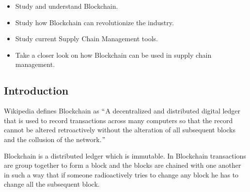 \documentclass[12pt]{article}
\begin{document}
\vspace{\baselineskip}
\begin{itemize}
	\item {\fontsize{14pt}{16.8pt}\selectfont Study and understand Blockchain.\par}\par

	\item {\fontsize{14pt}{16.8pt}\selectfont Study how Blockchain can revolutionize the industry.\par}\par

	\item {\fontsize{14pt}{16.8pt}\selectfont Study current Supply Chain Management tools.\par}\par

	\item {\fontsize{14pt}{16.8pt}\selectfont Take a closer look on how Blockchain can be used in supply chain management.\par}
\end{itemize}\par


\vspace{\baselineskip}

\vspace{\baselineskip}



\newpage

\vspace{\baselineskip}\begin{Center}
\section*{Introduction}
\end{Center}

{\fontsize{14pt}{16.8pt}\selectfont Wikipedia defines Blockchain as $``$A decentralized and distributed digital ledger that is used to record transactions across many computers so that the record cannot be altered retroactively without the alteration of all subsequent blocks and the collusion of the network.$"$ \par}\par

{\fontsize{14pt}{16.8pt}\selectfont Blockchain is a distributed ledger which is immutable. In Blockchain transactions are group together to form a block and the blocks are chained with one another in such a way that if someone radioactively tries to change any block he has to change all the subsequent block.\par}\par
\end{document}

